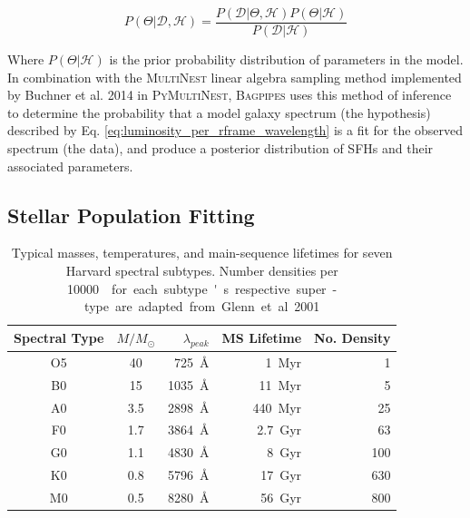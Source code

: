 \documentclass[a4paper,12pt]{article}
\begin{document}
\begin{equation}\label{eq:bayes_theorem}
  P(\Theta|\mathcal{D},\mathcal{H}) =
  \frac
  {P(\mathcal{D}|\Theta,\mathcal{H})P(\Theta|\mathcal{H})}
  {P(\mathcal{D}|\mathcal{H})}
\end{equation}

\noindent Where $P(\Theta|\mathcal{H})$ is the prior probability distribution
of parameters in the model. In combination with the \textsc{MultiNest} linear
algebra sampling method implemented by Buchner et al. 2014 in
\textsc{PyMultiNest}, \textsc{Bagpipes} uses this method of inference
to determine the probability that a model galaxy spectrum (the hypothesis)
described by Eq. \ref{eq:luminosity_per_rframe_wavelength} is a fit for the
observed spectrum (the data), and produce a posterior distribution of SFHs and
their associated parameters.\cite{Carnall_2018, Buchner_2014}

\subsection{Stellar Population Fitting}\label{sec:stellar_population_fitting}

\begin{table}
  \centering
  \begin{tabular}{c c r r r}
    Spectral Type & $M/M_\odot$ & $\lambda_{peak}$     & MS Lifetime   & No. Density \\
    \hline \hline
    O5            &	40          & \SI{725}{\angstrom}  & \SI{1}{Myr}   & 1           \\
    B0            &	15          & \SI{1035}{\angstrom} & \SI{11}{Myr}  & 5           \\
    A0            &	3.5         & \SI{2898}{\angstrom} & \SI{440}{Myr} & 25          \\
    F0            &	1.7         & \SI{3864}{\angstrom} & \SI{2.7}{Gyr} & 63          \\
    G0            &	1.1         & \SI{4830}{\angstrom} & \SI{8}{Gyr}   & 100         \\
    K0            &	0.8         & \SI{5796}{\angstrom} & \SI{17}{Gyr}  & 630         \\
    M0            &	0.5         & \SI{8280}{\angstrom} & \SI{56}{Gyr}  & 800         \\
    \hline
  \end{tabular}
  \caption{
  Typical masses, temperatures, and main-sequence lifetimes for seven Harvard
  spectral subtypes. Number densities per \SI{10000}{\cubic\parsec} for each
  subtype's respective super-type are adapted from Glenn et al.
  2001.\cite{Glenn_2001}
  }
  \label{tab:star_lifetimes_densities}
\end{table}
\end{document}
